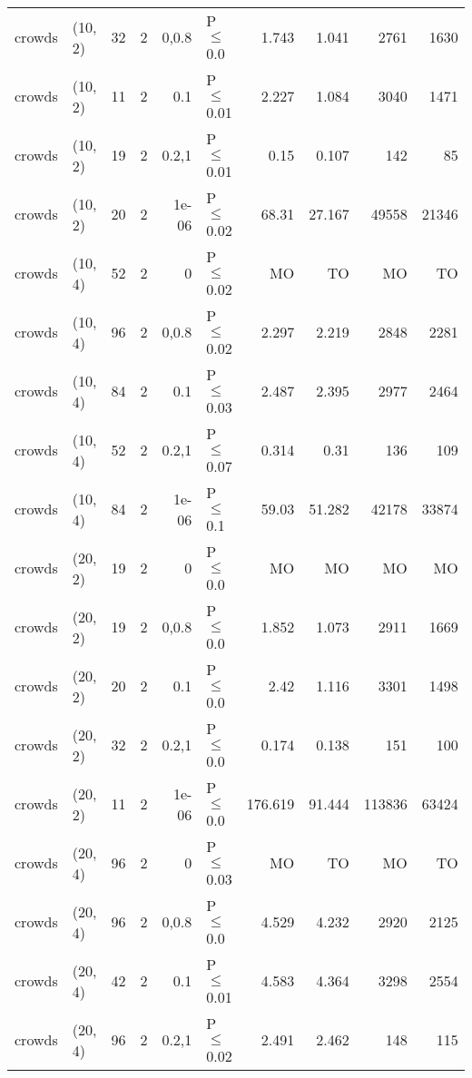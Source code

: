 \begin{longtable}{llrrrlrrrr}
 crowds        & (10, 2)  &     	32 &   2 & 0,0.8 & P$\leq$0.0   & 1.743    & 1.041    & 2761    & 1630    \\
 crowds        & (10, 2)  &     	11 &   2 & 0.1   & P$\leq$0.01  & 2.227    & 1.084    & 3040    & 1471    \\
 crowds        & (10, 2)  &     	19 &   2 & 0.2,1 & P$\leq$0.01  & 0.15     & 0.107    & 142     & 85      \\
 crowds        & (10, 2)  &     	20 &   2 & 1e-06 & P$\leq$0.02  & 68.31    & 27.167   & 49558   & 21346   \\
 crowds        & (10, 4)  &     	52 &   2 & 0     & P$\leq$0.02  & MO       & TO       & MO      & TO      \\
 crowds        & (10, 4)  &     	96 &   2 & 0,0.8 & P$\leq$0.02  & 2.297    & 2.219    & 2848    & 2281    \\
 crowds        & (10, 4)  &     	84 &   2 & 0.1   & P$\leq$0.03  & 2.487    & 2.395    & 2977    & 2464    \\
 crowds        & (10, 4)  &     	52 &   2 & 0.2,1 & P$\leq$0.07  & 0.314    & 0.31     & 136     & 109     \\
 crowds        & (10, 4)  &     	84 &   2 & 1e-06 & P$\leq$0.1   & 59.03    & 51.282   & 42178   & 33874   \\
 crowds        & (20, 2)  &     	19 &   2 & 0     & P$\leq$0.0   & MO       & MO       & MO      & MO      \\
 crowds        & (20, 2)  &     	19 &   2 & 0,0.8 & P$\leq$0.0   & 1.852    & 1.073    & 2911    & 1669    \\
 crowds        & (20, 2)  &     	20 &   2 & 0.1   & P$\leq$0.0   & 2.42     & 1.116    & 3301    & 1498    \\
 crowds        & (20, 2)  &     	32 &   2 & 0.2,1 & P$\leq$0.0   & 0.174    & 0.138    & 151     & 100     \\
 crowds        & (20, 2)  &     	11 &   2 & 1e-06 & P$\leq$0.0   & 176.619  & 91.444   & 113836  & 63424   \\
 crowds        & (20, 4)  &     	96 &   2 & 0     & P$\leq$0.03  & MO       & TO       & MO      & TO      \\
 crowds        & (20, 4)  &     	96 &   2 & 0,0.8 & P$\leq$0.0   & 4.529    & 4.232    & 2920    & 2125    \\
 crowds        & (20, 4)  &     	42 &   2 & 0.1   & P$\leq$0.01  & 4.583    & 4.364    & 3298    & 2554    \\
 crowds        & (20, 4)  &     	96 &   2 & 0.2,1 & P$\leq$0.02  & 2.491    & 2.462    & 148     & 115     \\

\end{longtable}
